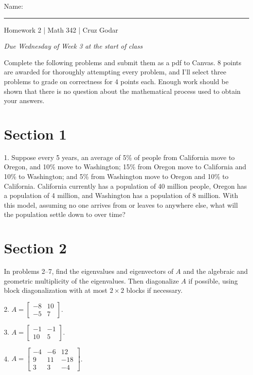 \documentclass{article}
\begin{document}
\Large Name: \rule{2in}{0.15mm} \hfill Homework 2 | Math 342 | Cruz Godar \vspace{4pt}  \normalsize

\textit{Due Wednesday of Week 3 at the start of class}

Complete the following problems and submit them as a pdf to Canvas. 8 points are awarded for thoroughly attempting every problem, and I'll select three problems to grade on correctness for 4 points each. Enough work should be shown that there is no question about the mathematical process used to obtain your answers.

\section{Section 1}

1. Suppose every 5 years, an average of 5\% of people from California move to Oregon, and 10\% move to Washington; 15\% from Oregon move to California and 10\% to Washington; and 5\% from Washington move to Oregon and 10\% to California. California currently has a population of 40 million people, Oregon has a population of 4 million, and Washington has a population of 8 million. With this model, assuming no one arrives from or leaves to anywhere else, what will the population settle down to over time?

\section{Section 2}

In problems 2--7, find the eigenvalues and eigenvectors of $A$ and the algebraic and geometric multiplicity of the eigenvalues. Then diagonalize $A$ if possible, using block diagonalization with at most $2 \times 2$ blocks if necessary.

2. $A = \left[\begin{array}{cc} -8& 10 \\ -5& 7 \end{array}\right]$.

3. $A = \left[\begin{array}{cc} -1& -1 \\ 10& 5 \end{array}\right]$.

4. $A = \left[\begin{array}{ccc} -4& -6& 12 \\ 9& 11& -18 \\ 3& 3& -4 \end{array}\right]$.
\end{document}
